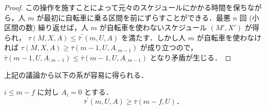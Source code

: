 \begin{proof}
この操作を施すことによって元々のスケジュールにかかる時間を保ちながら，人 $m$ が最初に自転車に乗る区間を前にずらすことができる．最悪 $n$ 回 (小区間の数) 繰り返せば，人 $m$ が自転車を使わないスケジュール $(M\prime, X\prime)$ が得られ， $\tau(M, X, A) \leq \bar\tau^{\prime}(m, U, A)$ を満たす．しかし人 $m$ が自転車を使わなければ $\tau(M, X, A) \geq \bar\tau(m - 1, U, A_{:m-1})$ が成り立つので， $\bar\tau(m - 1, U, A_{:m-1}) \leq \bar\tau(m - 1, U,A_{:m-1})$ となり矛盾が生じる．
\end{proof}
上記の議論から以下の系が容易に得られる．
\begin{corollary}\label{corollary:fsabs-lower-bound-bs}
  $i \leq m - f$ に対し $A_i = 0$ とする．
  \begin{equation}
    \bar\tau^{\prime}(m, U, A) \geq \bar\tau(m - f, U)．
  \end{equation}
\end{corollary}
